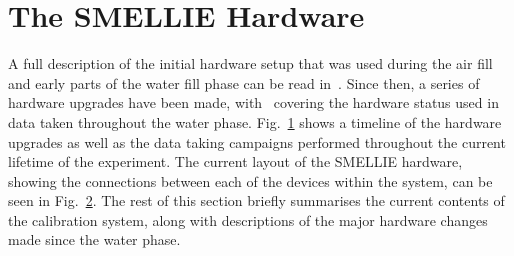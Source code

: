 \section{The SMELLIE Hardware}\label{sec:smellie_hardware}
A full description of the initial hardware setup that was used during the air fill and early parts of the water fill phase can be read in~\cite{}. %
Since then, a series of hardware upgrades have been made, with~\cite{} %
covering the hardware status used in data taken throughout the water phase.
Fig.~\ref{fig:smellie_timeline} shows a timeline of the hardware upgrades as well as the data taking campaigns performed throughout the current lifetime of the experiment. The current layout of the SMELLIE hardware, showing the connections between each of the devices within the system, can be seen in Fig.~\ref{fig:smellie_diagram_detailed}. The rest of this section briefly summarises the current contents of the calibration system, along with descriptions of the major hardware changes made since the water phase.

\begin{figure}
    \centering
    \caption[]{}
    \label{fig:smellie_timeline}
\end{figure}

\begin{figure}
    \centering
    \caption[]{}
    \label{fig:smellie_diagram_detailed}
\end{figure}

